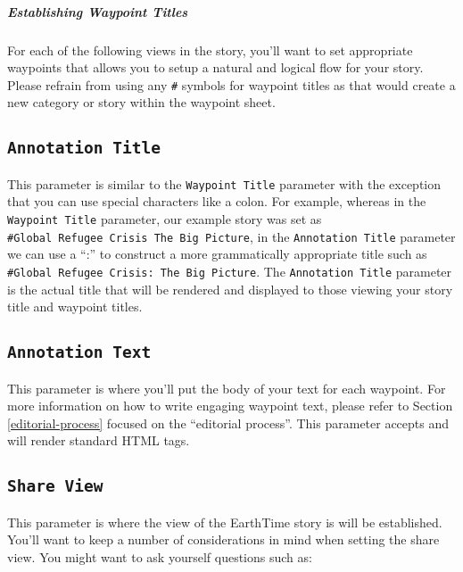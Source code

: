 \documentclass[
]{book}
\begin{document}
\hypertarget{establishing-waypoint-titles}{%
\subparagraph*{Establishing Waypoint Titles}\label{establishing-waypoint-titles}}

For each of the following views in the story, you'll want to set appropriate waypoints that allows you to setup a natural and logical flow for your story. Please refrain from using any \texttt{\#} symbols for waypoint titles as that would create a new category or story within the waypoint sheet.

\hypertarget{annotation-title}{%
\subsection*{\texorpdfstring{\texttt{Annotation\ Title}}{Annotation Title}}\label{annotation-title}}


This parameter is similar to the \texttt{Waypoint\ Title} parameter with the exception that you can use special characters like a colon. For example, whereas in the \texttt{Waypoint\ Title} parameter, our example story was set as \texttt{\#Global\ Refugee\ Crisis\ The\ Big\ Picture}, in the \texttt{Annotation\ Title} parameter we can use a ``:'' to construct a more grammatically appropriate title such as \texttt{\#Global\ Refugee\ Crisis:\ The\ Big\ Picture}. The \texttt{Annotation\ Title} parameter is the actual title that will be rendered and displayed to those viewing your story title and waypoint titles.

\hypertarget{annotation-text}{%
\subsection*{\texorpdfstring{\texttt{Annotation\ Text}}{Annotation Text}}\label{annotation-text}}


This parameter is where you'll put the body of your text for each waypoint. For more information on how to write engaging waypoint text, please refer to Section \ref{editorial-process} focused on the ``editorial process''. This parameter accepts and will render standard HTML tags.

\hypertarget{share-view}{%
\subsection*{\texorpdfstring{\texttt{Share\ View}}{Share View}}\label{share-view}}


This parameter is where the view of the EarthTime story is will be established. You'll want to keep a number of considerations in mind when setting the share view. You might want to ask yourself questions such as:
\end{document}
